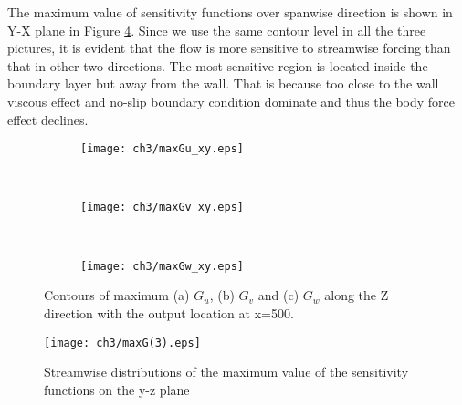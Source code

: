 The maximum value of sensitivity functions over spanwise direction is shown in Y-X plane in Figure \ref{f:Guvw_xy}. Since we use the same contour level in all the three pictures, it is evident that the flow is more sensitive to streamwise forcing than that in other two directions. The most sensitive region is located inside the boundary layer but away from the wall. That is because too close to the wall viscous effect and no-slip boundary condition dominate and thus the body force effect declines.
\begin{figure}
  \centering
  \begin{subfigure}{\textwidth}
  \texttt{[image: ch3/maxGu\_xy.eps]}
  \caption{\label{f:Gu_xy}}
  \end{subfigure}\\
  \bigskip
  \begin{subfigure}{\textwidth}
  \texttt{[image: ch3/maxGv\_xy.eps]}
  \caption{\label{f:Gv_xy}}
  \end{subfigure}\\
  \bigskip
  \begin{subfigure}{\textwidth}
  \texttt{[image: ch3/maxGw\_xy.eps]}
  \caption{\label{f:Gw_xy}}
  \end{subfigure}
  \caption{Contours of maximum (a) $G_u$, (b) $G_v$ and (c) $G_w$ along the Z direction with the output location at x=500.}\label{f:Guvw_xy}
\end{figure}

\begin{figure}[htb]
  \centering
  \texttt{[image: ch3/maxG(3).eps]}\\
  \caption{Streamwise distributions of the maximum value of the sensitivity functions on the y-z plane}\label{f:maxsen}
\end{figure}

